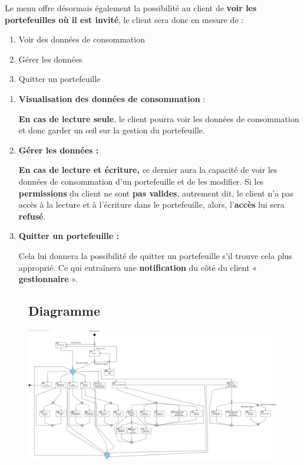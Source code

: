 \newpage

\begin{flushleft}
Le menu offre désormais également la possibilité au client de \textbf{voir les portefeuilles où il est invité}, le client sera donc en mesure de :
\end{flushleft}

\begin{enumerate}[1.]
\item Voir des données de consommation
\item Gérer les données
\item Quitter un portefeuille
\end{enumerate}

\begin{enumerate}[-]
\item \textbf{Visualisation des données de consommation} :

\textbf{En cas de lecture seule}, le client pourra voir les données de consommation et donc garder un œil sur la gestion du portefeuille.

\item \textbf{Gérer les données :}

\textbf{En cas de lecture et écriture,} ce dernier aura la capacité de voir les données de consommation d’un portefeuille et de les modifier.
\newline
Si les \textbf{permissions} du client ne sont \textbf{pas valides}, autrement dit, le client n’a pas accès à la lecture et à l’écriture dans le portefeuille, alors, l’\textbf{accès} lui sera \textbf{refusé}.

\item \textbf{Quitter un portefeuille :}

Cela lui donnera la possibilité de quitter un portefeuille s’il trouve cela plus approprié.
\newline
Ce qui entraînera une \textbf{notification} du côté du client « \textbf{gestionnaire} ».

\end{enumerate}


\begin{figure}[h]
\subsection{Diagramme}
\centering
\includegraphics[width = 1\textwidth]{Extension-claire/Overview-claire/img/overview.png}
\end{figure}